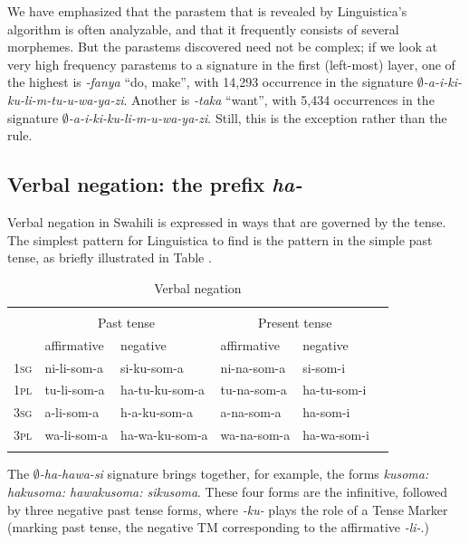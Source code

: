 \documentclass[output=paper,colorlinks,citecolor=brown]{langscibook}
\begin{document}
We have emphasized that the parastem that is revealed by Linguistica's algorithm is often analyzable, and that it frequently consists of several morphemes. But the parastems discovered need not be complex; if we look at very high frequency parastems to a signature in the first (left-most) layer, one of the highest is \textit{-fanya} ``do, make'', with 14,293 occurrence in the signature \textit{$\emptyset$-a-i-ki-ku-li-m-tu-u-wa-ya-zi}. Another is \textit{-taka} ``want'', with 5,434 occurrences in the signature  \textit{$\emptyset$-a-i-ki-ku-li-m-u-wa-ya-zi}. Still, this is the exception rather than the rule.
 
\subsection{Verbal negation: the prefix \textit{ha-}}

Verbal negation in Swahili is expressed in ways that are governed by the tense. The simplest pattern for Linguistica to find  is the pattern in the simple past tense, as briefly illustrated in Table .

\begin{table}
\begin{tabular}{llllll} \lsptoprule
\multicolumn{5}{c}{\textit{ku-som-a} `to read'}\\
 & \multicolumn{2}{c}{Past tense} & \multicolumn{2}{c}{Present tense} \\\cmidrule(lr){2-3}\cmidrule(lr){4-5}
 & affirmative & negative & affirmative & negative \\\midrule
\textsc{1sg} & ni-li-som-a & si-ku-som-a & ni-na-som-a & si-som-i \\
\textsc{1pl}& tu-li-som-a  & ha-tu-ku-som-a & tu-na-som-a & ha-tu-som-i \\
\textsc{3sg}& a-li-som-a  & h-a-ku-som-a & a-na-som-a & ha-som-i \\
\textsc{3pl} & wa-li-som-a & ha-wa-ku-som-a & wa-na-som-a & ha-wa-som-i \\\lspbottomrule
\end{tabular} 
\caption{Verbal negation}
\label{negation}
\end{table}

The \textit{$\emptyset$-ha-hawa-si} signature brings together, for example, the forms \textit{kusoma: hakusoma: hawakusoma: sikusoma}. These four forms are the infinitive, followed by three negative past tense forms, where \textit{-ku-} plays the role of a Tense Marker (marking past tense, the negative TM corresponding to the affirmative \textit{-li-}.) 
\end{document}
